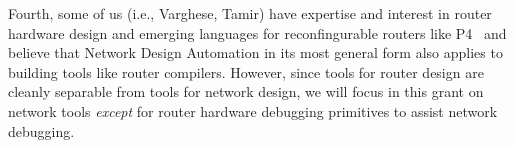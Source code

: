 Fourth, some of us (i.e., Varghese, Tamir) have expertise and interest in router
hardware design and emerging languages for reconfingurable routers like P4~\cite{P4} and believe that Network Design Automation in its most general form also applies to building tools like router compilers.  However, since tools for router design are cleanly separable from tools for network design, we will focus in this grant on
network tools {\em except} for router hardware debugging primitives to
assist network debugging.

